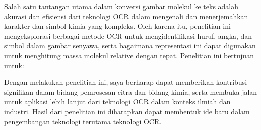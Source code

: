 \documentclass[12pt]{article}
\begin{document}
    Salah satu tantangan utama dalam konversi gambar molekul ke teks adalah akurasi dan efisiensi dari teknologi OCR dalam mengenali dan menerjemahkan karakter dan simbol kimia yang kompleks. Oleh karena itu, penelitian ini mengeksplorasi berbagai metode OCR untuk mengidentifikasi huruf, angka, dan simbol dalam gambar senyawa, serta bagaimana representasi ini dapat digunakan untuk menghitung massa molekul relative dengan tepat. \vspace{1em}
    Penelitian ini bertujuan untuk:
    \begin{enumerate}[leftmargin=2cm, rightmargin=1cm]  %
        
        
    \end{enumerate} 
    Dengan melakukan penelitian ini, saya berharap dapat memberikan kontribusi signifikan dalam bidang pemrosesan citra dan bidang kimia, serta membuka jalan untuk aplikasi lebih lanjut dari teknologi OCR dalam konteks ilmiah dan industri. Hasil dari penelitian ini diharapkan dapat membentuk ide baru dalam pengembangan teknologi terutama teknologi OCR.  
\end{document}
